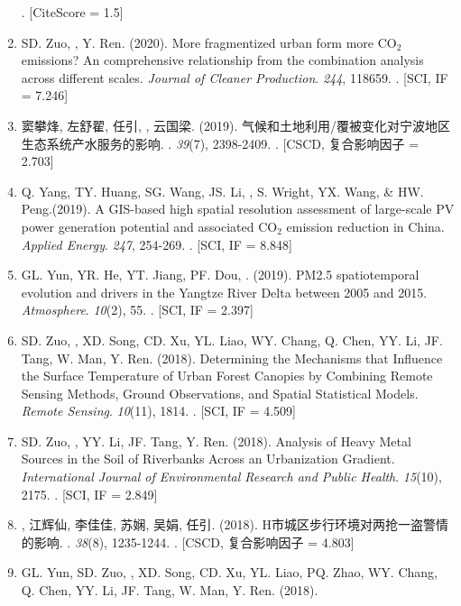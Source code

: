 \begin{enumerate}
    . [CiteScore = 1.5]
\item
    SD. Zuo, \Shaoqing, Y. Ren. (2020).
    More fragmentized urban form more CO$_2$ emissions? An comprehensive relationship from the combination analysis across different scales.
    \textit{Journal of Cleaner Production}. \textit{244}, 118659.
    . [SCI, IF = 7.246]
\item
    窦攀烽, 左舒翟, 任引, {}, 云国梁. (2019).
    气候和土地利用/覆被变化对宁波地区生态系统产水服务的影响.
    {}. \textit{39}(7), 2398-2409.
    . [CSCD, 复合影响因子 = 2.703] 
\item
    Q. Yang, TY. Huang, SG. Wang, JS. Li, \Shaoqing, S. Wright, YX. Wang, \& HW. Peng.(2019).
    A GIS-based high spatial resolution assessment of large-scale PV power generation potential and associated CO$_2$ emission reduction in China.
    \textit{Applied Energy}. \textit{247}, 254-269.
    . [SCI, IF = 8.848]
\item
    GL. Yun, YR. He, YT. Jiang, PF. Dou, \Shaoqing. (2019).
    PM2.5 spatiotemporal evolution and drivers in the Yangtze River Delta between 2005 and 2015.
    \textit{Atmosphere}. \textit{10}(2), 55.
    . [SCI, IF = 2.397]
\item
    SD. Zuo, \Shaoqing, XD. Song, CD. Xu, YL. Liao, WY. Chang, Q. Chen, YY. Li, JF. Tang, W. Man, Y. Ren. (2018).
    Determining the Mechanisms that Influence the Surface Temperature of Urban Forest Canopies by Combining Remote Sensing Methods, Ground Observations, and Spatial Statistical Models. 
    \textit{Remote Sensing}. \textit{10}(11), 1814.
    . [SCI, IF = 4.509]
\item
    SD. Zuo, \Shaoqing, YY. Li, JF. Tang, Y. Ren. (2018).
	Analysis of Heavy Metal Sources in the Soil of Riverbanks Across an Urbanization Gradient.
    \textit{International Journal of Environmental Research and Public Health}. \textit{15}(10), 2175.
    . [SCI, IF = 2.849]
\item
    {}, 江辉仙, 李佳佳, 苏娴, 吴娟, 任引. (2018).
	H市城区步行环境对两抢一盗警情的影响.
    {}.  \textit{38}(8), 1235-1244.
    . [CSCD, 复合影响因子 = 4.803]
\item
    GL. Yun, SD. Zuo, \Shaoqing, XD. Song, CD. Xu, YL. Liao, PQ. Zhao, WY. Chang, Q. Chen, YY. Li, JF. Tang, W. Man, Y. Ren. (2018).

\end{enumerate}
